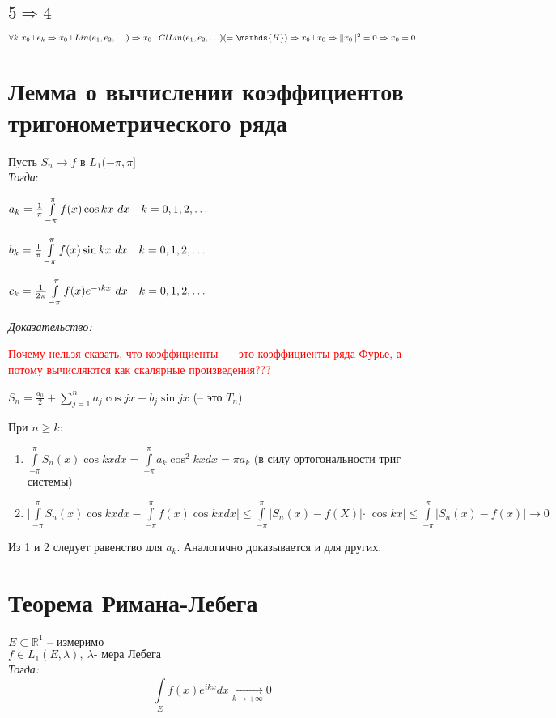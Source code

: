 \documentclass[paper=a4, fontsize=14pt]{report}
\begin{document}
\subsection{\texorpdfstring{$5 \Rightarrow 4$}{TEXT}}
$\forall k \ x_0 \bot e_k \Rightarrow x_0 \bot Lin(e_1, e_2, \mathellipsis) \Rightarrow x_0 \bot Cl Lin(e_1, e_2, \mathellipsis)( = \mathds{H}) \Rightarrow x_0 \bot x_0 \Rightarrow \|x_0\|^2 = 0 \Rightarrow x_0 = 0$


    \section{Лемма о вычислении коэффициентов тригонометрического ряда}

    Пусть $S_n \rightarrow f$ в $L_1(-\pi, \pi]$\\

    \emph{Тогда}:

    $a_k = \frac{1}{\pi}\int\limits_{-\pi}^{\pi}f(x)\cos kx\ dx \quad k = 0, 1, 2, \mathellipsis$

    $b_k = \frac{1}{\pi}\int\limits_{-\pi}^{\pi}f(x)\sin kx\ dx \quad k = 0, 1, 2, \mathellipsis$

    $c_k = \frac{1}{2\pi}\int\limits_{-\pi}^{\pi}f(x)e^{-ikx}\ dx \quad k = 0, 1, 2, \mathellipsis$


\emph{Доказательство:}

\textcolor{red}{Почему нельзя сказать, что коэффициенты~--- это коэффициенты ряда Фурье, а потому вычисляются как скалярные произведения???}

$S_n=\frac{a_0}2 + \sum\limits_{j=1}^n a_j \cos jx + b_j \sin jx$ (-- это $T_n$)

При $n \ge k:$

\begin{enumerate}
	\item
		$\int\limits_{-\pi}^{\pi} S_n(x) \cos kx dx = \int\limits_{-\pi}^{\pi} a_k \cos^2 kx dx = \pi a_k$
		(в силу ортогональности триг системы)
	\item
		$\vert \int\limits_{-\pi}^{\pi} S_n(x) \cos kx dx - \int\limits_{-\pi}^{\pi} f(x) \cos kx dx \vert \le \int\limits_{-\pi}^{\pi} \vert S_n(x)-f(X) \vert \cdot \vert \cos kx \vert \le \int\limits_{-\pi}^{\pi} \vert S_n(x) - f(x) \vert \rightarrow 0$
\end{enumerate}

Из 1 и 2 следует равенство для $a_k$. Аналогично доказывается и для других.



    \section{Теорема Римана-Лебега}
    $E \subset \mathds{R}^1$ -- измеримо\\ $f \in L_1(E, \lambda), ~ \lambda \text{- мера Лебега}$ \\
    \emph{Тогда:}
    $$\int\limits_{E}f(x)e^{ikx}dx \xrightarrow[k \to +\infty]{} 0$$
\end{document}

